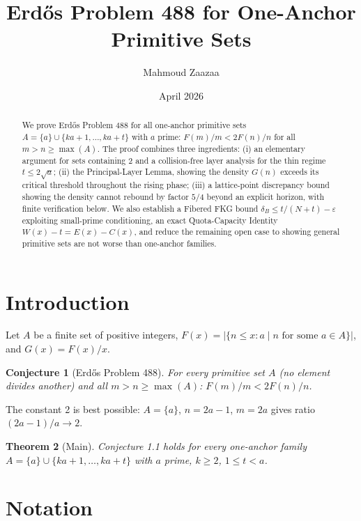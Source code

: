 \documentclass[11pt,a4paper]{article}
\title{Erd\H{o}s Problem 488 for One-Anchor Primitive Sets}
\author{Mahmoud Zaazaa}
\date{April 2026}
\newtheorem{theorem}{Theorem}[section]
\newtheorem{conjecture}[theorem]{Conjecture}
\theoremstyle{definition}
\begin{document}
\maketitle

\begin{abstract}
We prove Erd\H{o}s Problem 488 for all one-anchor primitive sets $A = \{a\} \cup \{ka+1,\ldots,ka+t\}$ with $a$ prime: $F(m)/m < 2F(n)/n$ for all $m > n \geq \max(A)$. The proof combines three ingredients: (i) an elementary argument for sets containing 2 and a collision-free layer analysis for the thin regime $t \leq 2\sqrt{a}$; (ii) the Principal-Layer Lemma, showing the density $G(n)$ exceeds its critical threshold throughout the rising phase; (iii) a lattice-point discrepancy bound showing the density cannot rebound by factor $5/4$ beyond an explicit horizon, with finite verification below. We also establish a Fibered FKG bound $\delta_B \leq t/(N+t) - \varepsilon$ exploiting small-prime conditioning, an exact Quota-Capacity Identity $W(x) - t = E(x) - C(x)$, and reduce the remaining open case to showing general primitive sets are not worse than one-anchor families.
\end{abstract}

\tableofcontents
\newpage

\section{Introduction}

Let $A$ be a finite set of positive integers, $F(x) = |\{n \leq x : a \mid n \text{ for some } a \in A\}|$, and $G(x) = F(x)/x$.

\begin{conjecture}[Erd\H{o}s Problem 488] For every primitive set $A$ (no element divides another) and all $m > n \geq \max(A)$: $F(m)/m < 2F(n)/n$. \end{conjecture}

The constant 2 is best possible: $A = \{a\}$, $n = 2a-1$, $m = 2a$ gives ratio $(2a-1)/a \to 2$.

\begin{theorem}[Main]\label{thm:main} Conjecture 1.1 holds for every one-anchor family $A = \{a\} \cup \{ka+1, \ldots, ka+t\}$ with $a$ prime, $k \geq 2$, $1 \leq t < a$. \end{theorem}

\section{Notation}
\end{document}
